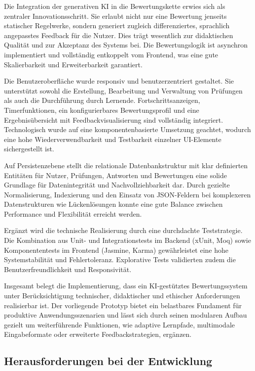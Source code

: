 \documentclass[a4paper,12pt]{article}
\begin{document}
Die Integration der generativen KI in die Bewertungskette erwies sich als zentraler Innovationsschritt. Sie erlaubt nicht nur eine Bewertung jenseits statischer Regelwerke, sondern generiert zugleich differenziertes, sprachlich angepasstes Feedback für die Nutzer. Dies trägt wesentlich zur didaktischen Qualität und zur Akzeptanz des Systems bei. Die Bewertungslogik ist asynchron implementiert und vollständig entkoppelt vom Frontend, was eine gute Skalierbarkeit und Erweiterbarkeit garantiert.

Die Benutzeroberfläche wurde responsiv und benutzerzentriert gestaltet. Sie unterstützt sowohl die Erstellung, Bearbeitung und Verwaltung von Prüfungen als auch die Durchführung durch Lernende. Fortschrittsanzeigen, Timerfunktionen, ein konfigurierbares Bewertungsprofil und eine Ergebnisübersicht mit Feedbackvisualisierung sind vollständig integriert. Technologisch wurde auf eine komponentenbasierte Umsetzung geachtet, wodurch eine hohe Wiederverwendbarkeit und Testbarkeit einzelner UI-Elemente sichergestellt ist.

Auf Persistenzebene stellt die relationale Datenbankstruktur mit klar definierten Entitäten für Nutzer, Prüfungen, Antworten und Bewertungen eine solide Grundlage für Datenintegrität und Nachvollziehbarkeit dar. Durch gezielte Normalisierung, Indexierung und den Einsatz von JSON-Feldern bei komplexeren Datenstrukturen wie Lückenlösungen konnte eine gute Balance zwischen Performance und Flexibilität erreicht werden.

Ergänzt wird die technische Realisierung durch eine durchdachte Teststrategie. Die Kombination aus Unit- und Integrationstests im Backend (xUnit, Moq) sowie Komponententests im Frontend (Jasmine, Karma) gewährleistet eine hohe Systemstabilität und Fehlertoleranz. Explorative Tests validierten zudem die Benutzerfreundlichkeit und Responsivität.

Insgesamt belegt die Implementierung, dass ein KI-gestütztes Bewertungssystem unter Berücksichtigung technischer, didaktischer und ethischer Anforderungen realisierbar ist. Der vorliegende Prototyp bietet ein belastbares Fundament für produktive Anwendungsszenarien und lässt sich durch seinen modularen Aufbau gezielt um weiterführende Funktionen, wie adaptive Lernpfade, multimodale Eingabeformate oder erweiterte Feedbackstrategien, ergänzen.

\subsection{Herausforderungen bei der Entwicklung}
\end{document}
